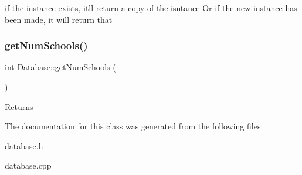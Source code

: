 if the instance exists, it\textquotesingle{}ll return a copy of the isntance Or if the new instance has been made, it will return that \mbox{\label{class_database_aa5d167b5300b715844a760ed9d7e223f}} 
\subsubsection{\texorpdfstring{get\+Num\+Schools()}{getNumSchools()}}
{\footnotesize\ttfamily int Database\+::get\+Num\+Schools (\begin{DoxyParamCaption}{ }\end{DoxyParamCaption})}


\begin{DoxyItemize}
\item \begin{DoxyReturn}{Returns}



\end{DoxyReturn}

\end{DoxyItemize}

The documentation for this class was generated from the following files\+:\begin{DoxyCompactItemize}
\item 
database.\+h\item 
database.\+cpp\end{DoxyCompactItemize}
